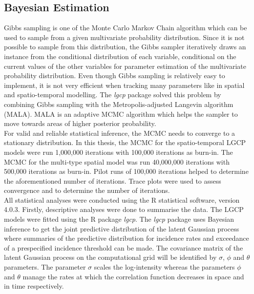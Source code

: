 \documentclass[12pt,a4paper]{report}
\begin{document}
\subsection{Bayesian Estimation}

Gibbs sampling is one of the Monte Carlo Markov Chain algorithm which can be used to sample from a given multivariate probability distribution. Since it is not possible to sample from this distribution, the Gibbs sampler iteratively draws an instance from the conditional distribution of each variable, conditional on the current values of the other variables for parameter estimation of the multivariate probability distribution. Even though Gibbs sampling is relatively easy to implement, it is not very efficient when tracking many parameters like in spatial and spatio-temporal modelling. The \textit{lgcp} package solved this problem by combining Gibbs sampling with the Metropolis-adjusted Langevin algorithm (MALA). MALA is an adaptive MCMC algorithm which helps the sampler to move towards areas of higher posterior probability.\cite{Taylor2013}\\

For valid and reliable statistical inference, the MCMC needs to converge to a stationary distribution. In this thesis, the MCMC for the spatio-temporal LGCP models were run 1,000,000 iterations with 100,000 iterations as burn-in. The MCMC for the multi-type spatial model was run 40,000,000 iterations with 500,000 iterations as burn-in. Pilot runs of 100,000 iterations helped to determine the aforementioned number of iterations. Trace plots were used to assess convergence and to determine the number of iterations.\\

All statistical analyses were conducted using the R statistical software, version 4.0.3. Firstly, descriptive analyses were done to summarise the data. The LGCP models were fitted using the R package \textit{lgcp}\cite{Taylor2013}\cite{Taylor2015}. The \textit{lgcp} package uses Bayesian inference to get the joint predictive distribution of the latent Gaussian process where summaries of the predictive distribution for incidence rates and exceedance of a prespecified incidence threshold can be made. The covariance matrix of the latent Gaussian process on the computational grid will be identified by $\sigma$, $\phi$ and $\theta$ parameters. The parameter $\sigma$ scales the log-intensity whereas the parameters $\phi$ and $\theta$ manage the rates at which the correlation function decreases in space and in time respectively.\cite{Taylor2013}\cite{Taylor2015}\\
\end{document}
